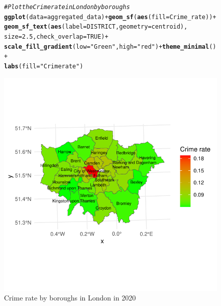 \documentclass{article}\usepackage[]{graphicx}\usepackage[]{xcolor}
\makeatletter
\def\maxwidth{ %
  \ifdim\Gin@nat@width>\linewidth
    \linewidth
  \else
    \Gin@nat@width
  \fi
}
\newcommand{\hlnum}[1]{\textcolor[rgb]{0.686,0.059,0.569}{#1}}%
\newcommand{\hlstr}[1]{\textcolor[rgb]{0.192,0.494,0.8}{#1}}%
\newcommand{\hlcom}[1]{\textcolor[rgb]{0.678,0.584,0.686}{\textit{#1}}}%
\newcommand{\hlopt}[1]{\textcolor[rgb]{0,0,0}{#1}}%
\newcommand{\hlstd}[1]{\textcolor[rgb]{0.345,0.345,0.345}{#1}}%
\newcommand{\hlkwc}[1]{\textcolor[rgb]{0.333,0.667,0.333}{#1}}%
\newcommand{\hlkwd}[1]{\textcolor[rgb]{0.737,0.353,0.396}{\textbf{#1}}}%
\newenvironment{kframe}{%
 \def\at@end@of@kframe{}%
 \ifinner\ifhmode%
  \def\at@end@of@kframe{\end{minipage}}%
  \begin{minipage}{\columnwidth}%
 \fi\fi%
 \def\FrameCommand##1{\hskip\@totalleftmargin \hskip-\fboxsep
 \colorbox{shadecolor}{##1}\hskip-\fboxsep
     \hskip-\linewidth \hskip-\@totalleftmargin \hskip\columnwidth}%
 \MakeFramed {\advance\hsize-\width
   \@totalleftmargin\z@ \linewidth\hsize
   \@setminipage}}%
 {\par\unskip\endMakeFramed%
 \at@end@of@kframe}
\newenvironment{knitrout}{}{} %
\makeatother
\begin{document}
\begin{figure}[H]
\begin{knitrout}\scriptsize
{}\color{fgcolor}\begin{kframe}
\begin{alltt}
\hlcom{# Plot the Crime rate in London by boroughs}
\hlkwd{ggplot}\hlstd{(}\hlkwc{data}\hlstd{=aggregated_data)} \hlopt{+} \hlkwd{geom_sf}\hlstd{(}\hlkwd{aes}\hlstd{(}\hlkwc{fill}\hlstd{=Crime_rate))} \hlopt{+}
  \hlkwd{geom_sf_text}\hlstd{(}\hlkwd{aes}\hlstd{(}\hlkwc{label} \hlstd{= DISTRICT,} \hlkwc{geometry} \hlstd{= centroid),}
               \hlkwc{size} \hlstd{=} \hlnum{2.5}\hlstd{,} \hlkwc{check_overlap} \hlstd{=} \hlnum{TRUE}\hlstd{)} \hlopt{+}
  \hlkwd{scale_fill_gradient}\hlstd{(}\hlkwc{low}\hlstd{=}\hlstr{"Green"}\hlstd{,} \hlkwc{high}\hlstd{=}\hlstr{"red"}\hlstd{)} \hlopt{+} \hlkwd{theme_minimal}\hlstd{()} \hlopt{+}
  \hlkwd{labs}\hlstd{(}\hlkwc{fill}\hlstd{=}\hlstr{"Crime rate"}\hlstd{)}
\end{alltt}
\end{kframe}

{\centering \includegraphics[width=\maxwidth]{figure/beamer-unnamed-chunk-7-1} 

}


\end{knitrout}
\centering
\caption{Crime rate by boroughs in London in 2020}
\label{fig:crime rate london}
\end{figure}
\end{document}

